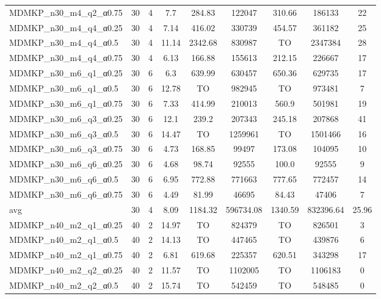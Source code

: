 \begin{table}[!ht]
{\begin{tabular}{lcccccccc}
MDMKP\_n30\_m4\_q2\_α0.75 & 30 & 4 &  \textcolor{blue2}{7.7} & 284.83 & 122047 & 310.66 & 186133 & 22 \\
MDMKP\_n30\_m4\_q4\_α0.25 & 30 & 4 &  \textcolor{blue2}{7.14} & 416.02 & 330739 & 454.57 & 361182 & 25 \\
MDMKP\_n30\_m4\_q4\_α0.5 & 30 & 4 &  \textcolor{blue2}{11.14} & 2342.68 & 830987 & TO & 2347384 & 28 \\
MDMKP\_n30\_m4\_q4\_α0.75 & 30 & 4 &  \textcolor{blue2}{6.13} & 166.88 & 155613 & 212.15 & 226667 & 17 \\
MDMKP\_n30\_m6\_q1\_α0.25 & 30 & 6 &  \textcolor{blue2}{6.3} & 639.99 & 630457 & 650.36 & 629735 & 17 \\
MDMKP\_n30\_m6\_q1\_α0.5 & 30 & 6 &  \textcolor{blue2}{12.78} & TO & 982945 & TO & 973481 & 7 \\
MDMKP\_n30\_m6\_q1\_α0.75 & 30 & 6 &  \textcolor{blue2}{7.33} & 414.99 & 210013 & 560.9 & 501981 & 19 \\
MDMKP\_n30\_m6\_q3\_α0.25 & 30 & 6 &  \textcolor{blue2}{12.1} & 239.2 & 207343 & 245.18 & 207868 & 41 \\
MDMKP\_n30\_m6\_q3\_α0.5 & 30 & 6 &  \textcolor{blue2}{14.47} & TO & 1259961 & TO & 1501466 & 16 \\
MDMKP\_n30\_m6\_q3\_α0.75 & 30 & 6 &  \textcolor{blue2}{4.73} & 168.85 & 99497 & 173.08 & 104095 & 10 \\
MDMKP\_n30\_m6\_q6\_α0.25 & 30 & 6 &  \textcolor{blue2}{4.68} & 98.74 & 92555 & 100.0 & 92555 & 9 \\
MDMKP\_n30\_m6\_q6\_α0.5 & 30 & 6 &  \textcolor{blue2}{6.95} & 772.88 & 771663 & 777.65 & 772457 & 14 \\
MDMKP\_n30\_m6\_q6\_α0.75 & 30 & 6 &  \textcolor{blue2}{4.49} & 81.99 & 46695 & 84.43 & 47406 & 7 \\
\cline{1-9} avg & 30 & 4 & 8.09 & 1184.32& 596734.08 & 1340.59& 832396.64 & 25.96\\ \cline{1-9}
MDMKP\_n40\_m2\_q1\_α0.25 & 40 & 2 &  \textcolor{blue2}{14.97} & TO & 824379 & TO & 826501 & 3 \\
MDMKP\_n40\_m2\_q1\_α0.5 & 40 & 2 &  \textcolor{blue2}{14.13} & TO & 447465 & TO & 439876 & 6 \\
MDMKP\_n40\_m2\_q1\_α0.75 & 40 & 2 &  \textcolor{blue2}{6.81} & 619.68 & 225357 & 620.51 & 343298 & 17 \\
MDMKP\_n40\_m2\_q2\_α0.25 & 40 & 2 &  \textcolor{blue2}{11.57} & TO & 1102005 & TO & 1106183 & 0 \\
MDMKP\_n40\_m2\_q2\_α0.5 & 40 & 2 &  \textcolor{blue2}{15.74} & TO & 542459 & TO & 548485 & 0 \\

\end{tabular}}
\end{table}
